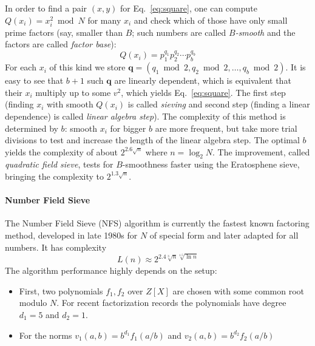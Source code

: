 \documentclass[a4paper]{article}
\begin{document}
In order to find a pair $(x,y)$ for Eq.~\eqref{eq:square}, one can compute $Q(x_i) = x_i^2\bmod{N}$ for many $x_i$ and check which of those have only small prime factors (say, smaller than $B$; such numbers are called \emph{$B$-smooth} and the factors are called \emph{factor base}): 
$$
Q(x_i) = p_1^{q_1}p_2^{q_2}\cdots p_b^{q_b}
$$For each $x_i$ of this kind we store $\mathbf{q}=(q_1 \bmod 2,q_2 \bmod 2,\ldots,q_b \bmod 2)$. It is easy to see that $b+1$ such $\mathbf{q}$ are linearly dependent, which is equivalent that their $x_i$ multiply up to some $v^2$, which yields Eq.~\eqref{eq:square}. The first step (finding $x_i$ with smooth $Q(x_i)$ is called \emph{sieving} and second step (finding a linear dependence) is called \emph{linear algebra step}).
The complexity of this method is determined by $b$: smooth $x_i$ for bigger $b$ are more frequent, but take more trial divisions to test and increase the length of the linear algebra step. The optimal $b$ yields the complexity of about $2^{2.6\sqrt{n}}$ where $n=\log_2 N$. The improvement, called \emph{quadratic field sieve}, tests for $B$-smoothness faster using the Eratosphene sieve, bringing the complexity to $2^{1.3\sqrt{n}}$.

\paragraph{Number Field Sieve} The Number Field Sieve (NFS) algorithm is currently the fastest known factoring method, developed in late 1980s for $N$ of special form and later adapted for all numbers. It has complexity 
$$
L(n) \approx 2^{2.4 \sqrt[3]{n}\sqrt[1.5]{\ln n}}
$$
The algorithm performance highly depends on the setup:
\begin{itemize}
    \item First, two polynomials $f_1,f_2$ over $Z[X]$ are chosen with some common root modulo $N$. For recent factorization records  the polynomials have degree $d_1=5$ and $d_2=1$. 
    \item For the norms $v_1(a,b) = b^{d_1}f_1(a/b)$ and  $v_2(a,b) = b^{d_2}f_2(a/b)$
\end{itemize}
\end{document}

